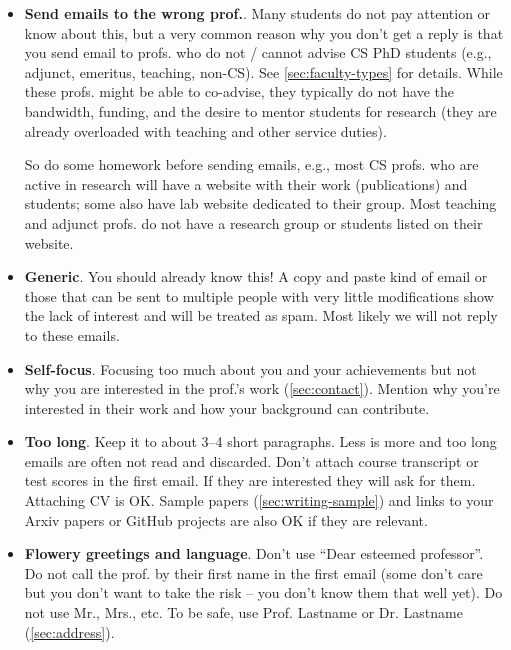 \documentclass[oneside,11pt]{book}
\begin{document}
\begin{itemize}
    \item \textbf{Send emails to the wrong prof.}. Many students do not pay attention or know about this, but a very common reason why you don't get a reply is that you send email to profs. who do not / cannot advise CS PhD students (e.g., adjunct, emeritus, teaching, non-CS). See \autoref{sec:faculty-types} for details. While these profs. might be able to co-advise, they typically do not have the bandwidth, funding, and the desire to mentor students for research (they are already overloaded with teaching and other service duties). 
    
    So do some homework before sending emails, e.g., most CS profs. who are active in research will have a website with their work (publications) and students; some also have lab website dedicated to their group. Most teaching and adjunct profs. do not have a research group or students listed on their website.  
        
    \item \textbf{Generic}. You should already know this! A copy and paste kind of email or those that can be sent to multiple people with very little modifications show the lack of interest and will be treated as spam. Most likely we will not reply to these emails. 

    \item \textbf{Self-focus}. Focusing too much about you and your achievements but not why you are interested in the prof.'s work (\autoref{sec:contact}). Mention why you're interested in their work and how your background can contribute. 

    \item \textbf{Too long}. Keep it to about 3--4 short paragraphs. Less is more and too long emails are often not read and discarded. Don't attach course transcript or test scores in the first email. If they are  interested they will ask for them.  Attaching CV is OK. Sample papers (\autoref{sec:writing-sample}) and links to your Arxiv papers or GitHub projects are also OK if they are relevant.
    
    \item \textbf{Flowery greetings and language}. Don't use ``Dear esteemed professor''.  Do not call the prof. by their first name in the first email (some don't care but you don't want to take the risk -- you don't know them that well yet).  Do not use Mr., Mrs., etc. To be safe, use Prof. Lastname or Dr. Lastname (\autoref{sec:address}).
    

\end{itemize}
\end{document}
